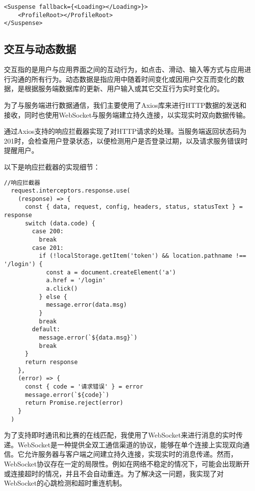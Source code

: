 \documentclass[12pt,a4paper]{article}
\begin{document}
\begin{CJK*}{UTF8}{gbsn}
\begin{mdframed}
\begin{verbatim}
<Suspense fallback={<Loading></Loading>}>
    <ProfileRoot></ProfileRoot>
</Suspense>
\end{verbatim}  
\end{mdframed}



\subsection{交互与动态数据}
交互指的是用户与应用界面之间的互动行为，如点击、滑动、输入等方式与应用进行沟通的所有行为。动态数据是指应用中随着时间变化或因用户交互而变化的数据，是根据服务端数据库的更新、用户输入或其它交互行为实时变化的。

为了与服务端进行数据通信，我们主要使用了Axios库来进行HTTP数据的发送和接收，同时也使用WebSocket与服务端建立持久连接，以实现实时双向数据传输。

通过Axios支持的响应拦截器实现了对HTTP请求的处理。当服务端返回状态码为201时，会检查用户登录状态，以便检测用户是否登录过期，以及请求服务错误时提醒用户。

以下是响应拦截器的实现细节：
\begin{mdframed}
\begin{verbatim}
//响应拦截器
  request.interceptors.response.use(
    (response) => {
      const { data, request, config, headers, status, statusText } = response
      switch (data.code) {
        case 200:
          break
        case 201:
          if (!localStorage.getItem('token') && location.pathname !== '/login') {
            const a = document.createElement('a')
            a.href = '/login'
            a.click()
          } else {
            message.error(data.msg)
          }
          break
        default:
          message.error(`${data.msg}`)
          break
      }
      return response
    },
    (error) => {
      const { code = '请求错误' } = error
      message.error(`${code}`)
      return Promise.reject(error)
    }
  )
\end{verbatim}
\end{mdframed}

为了支持即时通讯和比赛的在线匹配，我使用了WebSocket来进行消息的实时传递。WebSocket是一种提供全双工通信渠道的协议，能够在单个连接上实现双向通信。它允许服务器与客户端之间建立持久连接，实现实时的消息传递。然而，WebSocket协议存在一定的局限性。例如在网络不稳定的情况下，可能会出现断开或连接超时的情况，并且不会自动重连\cite{zhihu1}。为了解决这一问题，我实现了对WebSocket的心跳检测和超时重连机制。


\end{CJK*}
\end{document}
